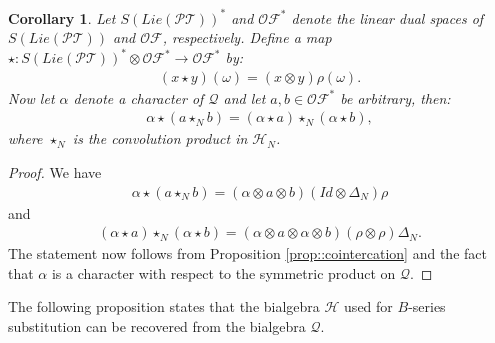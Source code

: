 \documentclass[10pt,a4paper]{article}
\newtheorem{corollary}{Corollary}[theorem]
\begin{document}
\begin{corollary}
Let $S(Lie(\mathcal{PT}))^{\ast}$ and $\mathcal{OF}^{\ast}$ denote the linear dual spaces of $S(Lie(\mathcal{PT}))$ and $\mathcal{OF}$, respectively. Define a map $\star: S(Lie(\mathcal{PT}))^{\ast} \otimes \mathcal{OF}^{\ast} \to \mathcal{OF}^{\ast}$ by:
\begin{align*}
(x \star y)(\omega)=(x \otimes y)\rho(\omega).
\end{align*}
Now let $\alpha$ denote a character of $\mathcal{Q}$ and let $a,b \in \mathcal{OF}^{\ast}$ be arbitrary, then:
\begin{align*}
\alpha \star (a \star_{N} b)=(\alpha \star a) \star_{N} (\alpha \star b),
\end{align*}
where $\star_N$ is the convolution product in $\mathcal{H}_N$.
\end{corollary}
\begin{proof}
We have
\begin{align*}
\alpha \star (a \star_N b)=(\alpha \otimes a \otimes b)(Id \otimes \Delta_N)\rho
\end{align*}
and
\begin{align*}
(\alpha \star a) \star_N (\alpha \star b)=(\alpha \otimes a \otimes \alpha \otimes b)(\rho\otimes \rho)\Delta_{N}.
\end{align*}
The statement now follows from Proposition \ref{prop::cointercation} and the fact that $\alpha$ is a character with respect to the symmetric product on $\mathcal{Q}$.
\end{proof}

The following proposition states that the bialgebra $\mathcal{H}$ used for $B$-series substitution can be recovered from the bialgebra $\mathcal{Q}$.
\end{document}
